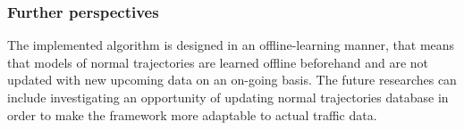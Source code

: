 \bigbreak

\subsubsection{Further perspectives}

The implemented algorithm is designed in an offline-learning manner, that means that models of normal trajectories are learned offline beforehand and are not updated with new upcoming data on an on-going basis. The future researches can include investigating an opportunity of updating normal trajectories database in order to make the framework more adaptable to actual traffic data.

